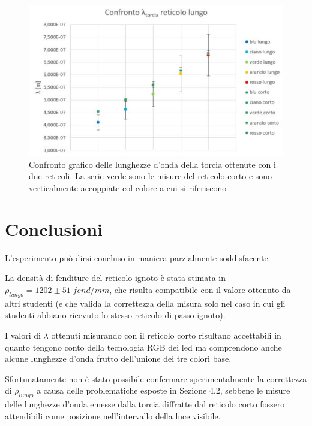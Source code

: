 \documentclass{article}
\begin{document}
\begin{figure}
    \centering
    \includegraphics[width=0.6\linewidth]{Confronto_graph.JPG}
    \caption{Confronto grafico delle lunghezze d'onda della torcia ottenute con i due reticoli. La serie verde sono le misure del reticolo corto e sono verticalmente accoppiate col colore a cui si riferiscono}
    \label{confrontotraidue}
\end{figure}

\section{Conclusioni}

L'esperimento può dirsi concluso in maniera parzialmente soddisfacente.

\vspace{3mm}

La densità di fenditure del reticolo ignoto è stata stimata in $\rho_{lungo} = 1202 \pm 51 \; fend/mm$, che risulta compatibile con il valore ottenuto da altri studenti (e che valida la correttezza della misura solo nel caso in cui gli studenti abbiano ricevuto lo stesso reticolo di passo ignoto). 

\vspace{3mm}

I valori di $\lambda$ ottenuti misurando con il reticolo corto risultano accettabili in quanto tengono conto della tecnologia RGB dei led ma comprendono anche alcune lunghezze d'onda frutto dell'unione dei tre colori base.

\vspace{3mm}

Sfortunatamente non è stato possibile confermare sperimentalmente la correttezza di $\rho_{lungo}$ a causa delle problematiche esposte in Sezione 4.2, sebbene le misure delle lunghezze d'onda emesse dalla torcia diffratte dal reticolo corto fossero attendibili come posizione nell'intervallo della luce visibile.
\end{document}
